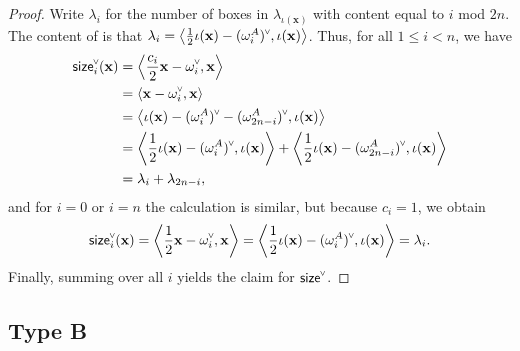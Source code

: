 \documentclass[ALCO,published]{cedram}
\newcommand{\chk}[1]{#1^{\normalfont\smash{\scalebox{.5}[.5]{\rotatebox{90}{\textbf{\textless}}}}}}
\newcommand{\size}{{\sf size}}
\begin{document}
\begin{proof}
Write $\lambda_i$ for the number of boxes in $\lambda_{\iota(\mathbf{x})}$ with content equal to $i$ mod $2n$. The content of  is that $\lambda_i=\left\langle\frac{1}{2}\iota(\mathbf{x})-\chk{(\omega_i^A)}, \iota(\mathbf{x})\right\rangle$. Thus,
for all $1\leq i<n$, we have
\begin{align*}
\chk{\size}_i(\mathbf{x}) &= \left\langle \frac{c_i}{2}\mathbf{x}-\chk{\omega_i}, \mathbf{x} \right\rangle \\
&= \left\langle \mathbf{x}- \chk{\omega_i}, \mathbf{x} \right\rangle \\
&= \left\langle \iota(\mathbf{x}) - \chk{(\omega_i^A)}-\chk{(\omega_{2n-i}^A)}, \iota(\mathbf{x}) \right\rangle \\
&= \left\langle \frac{1}{2} \iota(\mathbf{x}) - \chk{(\omega_i^A)}, \iota(\mathbf{x}) \right\rangle + \left\langle \frac{1}{2} \iota(\mathbf{x}) - \chk{(\omega_{2n-i}^A)}, \iota(\mathbf{x}) \right\rangle \\
&= \lambda_i + \lambda_{2n-i},
\end{align*}
and for $i=0$ or $i=n$ the calculation is similar, but because $c_i=1$, we obtain
\begin{equation*}
\chk{\size}_i(\mathbf{x}) 
= \left\langle \frac{1}{2}\mathbf{x}- \chk{\omega_i}, \mathbf{x} \right\rangle 
= \left\langle \frac{1}{2}\iota(\mathbf{x}) - \chk{(\omega_i^A)}, \iota(\mathbf{x}) \right\rangle 
= \lambda_i.
\end{equation*}
Finally, summing over all $i$ yields the claim for $\chk{\size}$.
\end{proof}


\subsection{Type B}
\label{sec:modelB}
\end{document}
